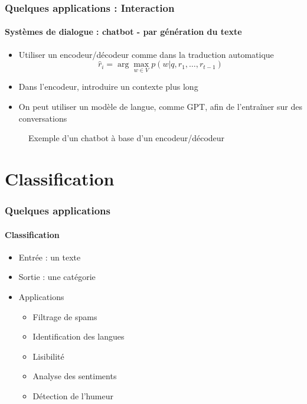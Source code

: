 \documentclass[xcolor=table]{beamer}
\begin{document}
\begin{frame}
	\frametitle{Quelques applications : Interaction}
	\framesubtitle{Systèmes de dialogue : chatbot - par génération du texte}
	
	\begin{itemize}
		\item Utiliser un encodeur/décodeur comme dans la traduction automatique
		\[ \hat{r}_i = \arg\max_{w \in V} p(w| q, r_1, \ldots, r_{t-1}) \]
		
		\item Dans l'encodeur, introduire un contexte plus long
		
		\item On peut utiliser un modèle de langue, comme GPT, afin de l'entraîner sur des conversations
	\end{itemize}
	
	\begin{figure}
		\centering
		\caption{Exemple d'un chatbot à base d'un encodeur/décodeur \cite{2020-jurafsky-martin}}
	\end{figure}
	
\end{frame}


\section{Classification}

\begin{frame}
	\frametitle{Quelques applications}
	\framesubtitle{Classification}
	
	\begin{itemize}
		\item Entrée : un texte
		\item Sortie : une catégorie
		\item Applications 
		\begin{itemize}
			\item Filtrage de spams
			\item Identification des langues
			\item Lisibilité 
			\item Analyse des sentiments
			\item Détection de l'humeur
		\end{itemize}
	\end{itemize}

\end{frame}
\end{document}
